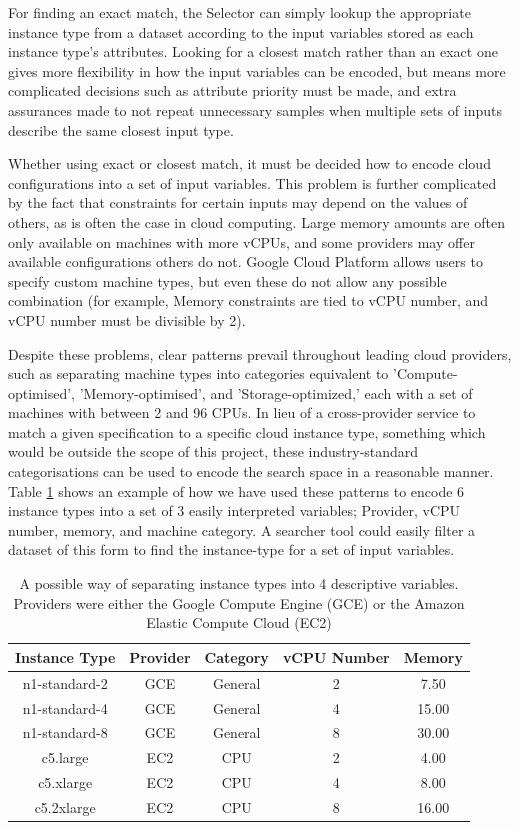 \documentclass{article}
\begin{document}
For finding an exact match, the Selector can simply lookup the appropriate instance type from a dataset according to the input variables stored as each instance type's attributes. Looking for a closest match rather than an exact one gives more flexibility in how the input variables can be encoded, but means more complicated decisions such as attribute priority must be made, and extra assurances made to not repeat unnecessary samples when multiple sets of inputs describe the same closest input type.

Whether using exact or closest match, it must be decided how to encode cloud configurations into a set of input variables. This problem is further complicated by the fact that constraints for certain inputs may depend on the values of others, as is often the case in cloud computing. Large memory amounts are often only available on machines with more vCPUs, and some providers may offer available configurations others do not. Google Cloud Platform allows users to specify custom machine types, but even these do not allow any possible combination (for example, Memory constraints are tied to vCPU number, and vCPU number must be divisible by 2).

Despite these problems, clear patterns prevail throughout leading cloud providers, such as separating machine types into categories equivalent to 'Compute-optimised', 'Memory-optimised', and 'Storage-optimized,' each with a set of machines with between 2 and 96 CPUs. In lieu of a cross-provider service to match a given specification to a specific cloud instance type, something which would be outside the scope of this project, these industry-standard categorisations can be used to encode the search space in a reasonable manner. Table \ref{tab:config-encode} shows an example of how we have used these patterns to encode 6 instance types into a set of 3 easily interpreted variables; Provider, vCPU number, memory, and machine category. A searcher tool could easily filter a dataset of this form to find the instance-type for a set of input variables.

\begin{table}[!t]
\centering
\begin{tabular}{ |c||c|c|c|c|  }
 \hline
 Instance Type & Provider & Category & vCPU Number & Memory \\
 \hline
 n1-standard-2    & GCE  & General & 2 & 7.50 \\
 n1-standard-4    & GCE  & General & 4 & 15.00 \\
 n1-standard-8    & GCE  & General & 8 & 30.00 \\
 c5.large         & EC2  & CPU & 2 & 4.00 \\
 c5.xlarge    & EC2  & CPU & 4 & 8.00 \\
 c5.2xlarge    & EC2  & CPU & 8 & 16.00 \\
 \hline
\end{tabular}
\caption{A possible way of separating instance types into 4 descriptive variables. Providers were either the Google Compute Engine (GCE) or the Amazon Elastic Compute Cloud (EC2)}
\label{tab:config-encode}
\end{table}
\end{document}
